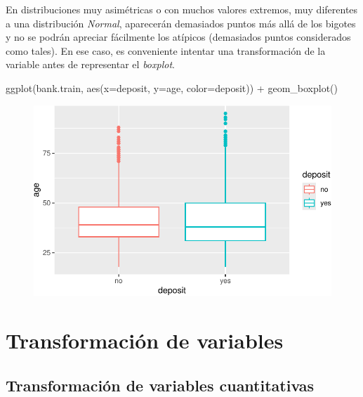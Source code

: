 \documentclass[
  letterpaper,
  DIV=11,
  numbers=noendperiod]{scrreprt}
\newenvironment{Shaded}{\begin{snugshade}}{\end{snugshade}}
\newcommand{\AttributeTok}[1]{\textcolor[rgb]{0.40,0.45,0.13}{#1}}
\newcommand{\FunctionTok}[1]{\textcolor[rgb]{0.28,0.35,0.67}{#1}}
\newcommand{\NormalTok}[1]{\textcolor[rgb]{0.00,0.23,0.31}{#1}}
\newcommand{\SpecialCharTok}[1]{\textcolor[rgb]{0.37,0.37,0.37}{#1}}
\begin{document}
En distribuciones muy asimétricas o con muchos valores extremos, muy
diferentes a una distribución \emph{Normal}, aparecerán demasiados
puntos más allá de los bigotes y no se podrán apreciar fácilmente los
atípicos (demasiados puntos considerados como tales). En ese caso, es
conveniente intentar una transformación de la variable antes de
representar el \emph{boxplot}.

\begin{Shaded}
\begin{Highlighting}[]
\FunctionTok{ggplot}\NormalTok{(bank.train, }\FunctionTok{aes}\NormalTok{(}\AttributeTok{x=}\NormalTok{deposit, }\AttributeTok{y=}\NormalTok{age, }\AttributeTok{color=}\NormalTok{deposit)) }\SpecialCharTok{+}
  \FunctionTok{geom\_boxplot}\NormalTok{()}
\end{Highlighting}
\end{Shaded}

\begin{figure}[H]

{\centering \includegraphics{eda_files/figure-pdf/unnamed-chunk-12-1.pdf}

}

\end{figure}

\hypertarget{transformaciuxf3n-de-variables}{%
\section{Transformación de
variables}\label{transformaciuxf3n-de-variables}}

\hypertarget{transformaciuxf3n-de-variables-cuantitativas}{%
\subsection{Transformación de variables
cuantitativas}\label{transformaciuxf3n-de-variables-cuantitativas}}
\end{document}

